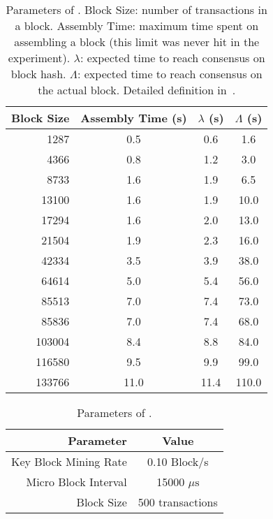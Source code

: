 \begin{table}[t]
	\centering
        \caption[Parameters of \algorand.]{Parameters of \algorand. Block Size: number of transactions in a block. Assembly Time: maximum time spent on assembling a block (this limit was never hit in the experiment). $\lambda$: expected time to reach consensus on block hash. $\Lambda$: expected time to reach consensus on the actual block. Detailed definition in~\cite{algorand}.}
	\begin{tabular}{ r | c | c | c } 
	 \hline
	 Block Size & Assembly Time (s) & $\lambda$ (s) & $\Lambda$ (s) \\ [0.5ex] 
	 \hline\hline
	 1287 & 0.5 & 0.6 & 1.6 \\
	 4366 & 0.8 & 1.2 & 3.0 \\
	 8733 & 1.6 & 1.9 & 6.5 \\
	 13100 & 1.6 & 1.9 & 10.0 \\
	 17294 & 1.6 & 2.0 & 13.0 \\
	 21504 & 1.9 & 2.3 & 16.0 \\
	 42334 & 3.5 & 3.9 & 38.0 \\
	 64614 & 5.0 & 5.4 & 56.0 \\
	 85513 & 7.0 & 7.4 & 73.0 \\
	 85836 & 7.0 & 7.4 & 68.0 \\
	 103004 & 8.4 & 8.8 & 84.0 \\
	 116580 & 9.5 & 9.9 & 99.0 \\
	 133766 & 11.0 & 11.4 & 110.0 \\
	 \hline
	\end{tabular}
\label{table:algorand-params}
\end{table}

\begin{table}[t]
	\centering
	\caption{Parameters of \bng.}
	\begin{tabular}{ r | c } 
	 \hline
	 Parameter & Value \\ [0.5ex] 
	 \hline\hline
	 Key Block Mining Rate & 0.10 Block/s \\
	 Micro Block Interval & 15000 $\mu\text{s}$ \\
	 Block Size & 500 transactions \\
	 \hline
	\end{tabular}
\label{table:bng-params}
\end{table}

